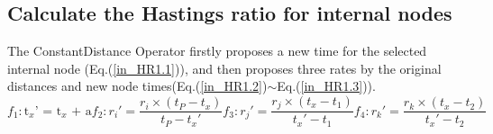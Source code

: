 \documentclass{bmcart}
\begin{document}
\begin{backmatter}
\subsection*{Calculate the Hastings ratio for internal nodes}
The ConstantDistance Operator firstly proposes a new time for the selected internal node (Eq.(\ref{in_HR1.1})), and then proposes three rates by the original distances and new node times(Eq.(\ref{in_HR1.2})$\sim$Eq.(\ref{in_HR1.3})).
\begin{subequations}\label{in_HR1}
\begin{equation}\label{in_HR1.1}
{f_1}:{{\text{t}}_x}{\text{'  =  }}{{\text{t}}_x}{\text{  +  a}} 
\end{equation}  
\begin{equation}\label{in_HR1.2}
{f_2}:{r_i}' = \frac{{{r_i} \times ({t_P} - {t_x})}}{{{t_P} - {t_x}'}} 
\end{equation}  
\begin{equation}
{f_3}:{r_j}' = \frac{{{r_j} \times ({t_x} - {t_1})}}{{{t_x}' - {t_1}}} 
\end{equation}  
\begin{equation}\label{in_HR1.3}
{f_4}:{r_k}' = \frac{{{r_k} \times ({t_x} - {t_2})}}{{{t_x}' - {t_2}}}  
\end{equation}  
\end{subequations}


\end{backmatter}
\end{document}
